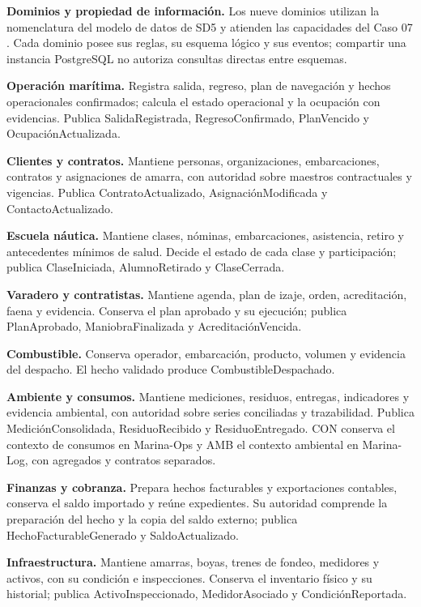\textbf{Dominios y propiedad de información.} Los nueve dominios utilizan la nomenclatura del modelo de datos de SD5 y atienden las capacidades del Caso 07 \parencite[caps.~4, 9 y 14]{caso07}. Cada dominio posee sus reglas, su esquema lógico y sus eventos; compartir una instancia PostgreSQL no autoriza consultas directas entre esquemas.

\textbf{Operación marítima.} Registra salida, regreso, plan de navegación y hechos operacionales confirmados; calcula el estado operacional y la ocupación con evidencias. Publica SalidaRegistrada, RegresoConfirmado, PlanVencido y OcupaciónActualizada.

\textbf{Clientes y contratos.} Mantiene personas, organizaciones, embarcaciones, contratos y asignaciones de amarra, con autoridad sobre maestros contractuales y vigencias. Publica ContratoActualizado, AsignaciónModificada y ContactoActualizado.

\textbf{Escuela náutica.} Mantiene clases, nóminas, embarcaciones, asistencia, retiro y antecedentes mínimos de salud. Decide el estado de cada clase y participación; publica ClaseIniciada, AlumnoRetirado y ClaseCerrada.

\textbf{Varadero y contratistas.} Mantiene agenda, plan de izaje, orden, acreditación, faena y evidencia. Conserva el plan aprobado y su ejecución; publica PlanAprobado, ManiobraFinalizada y AcreditaciónVencida.

\textbf{Combustible.} Conserva operador, embarcación, producto, volumen y evidencia del despacho. El hecho validado produce CombustibleDespachado.

\textbf{Ambiente y consumos.} Mantiene mediciones, residuos, entregas, indicadores y evidencia ambiental, con autoridad sobre series conciliadas y trazabilidad. Publica MediciónConsolidada, ResiduoRecibido y ResiduoEntregado. CON conserva el contexto de consumos en Marina-Ops y AMB el contexto ambiental en Marina-Log, con agregados y contratos separados.

\textbf{Finanzas y cobranza.} Prepara hechos facturables y exportaciones contables, conserva el saldo importado y reúne expedientes. Su autoridad comprende la preparación del hecho y la copia del saldo externo; publica HechoFacturableGenerado y SaldoActualizado.

\textbf{Infraestructura.} Mantiene amarras, boyas, trenes de fondeo, medidores y activos, con su condición e inspecciones. Conserva el inventario físico y su historial; publica ActivoInspeccionado, MedidorAsociado y CondiciónReportada.

